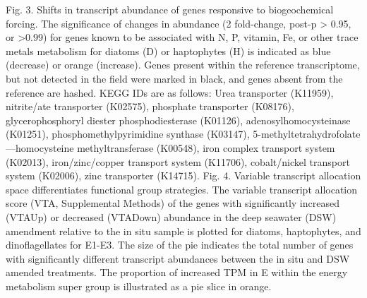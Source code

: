 Fig. 3. Shifts in transcript abundance of genes responsive to biogeochemical forcing. The significance of changes in abundance (2 fold-change, post-p > 0.95, or >0.99) for genes known to be associated with N, P, vitamin, Fe, or other trace metals metabolism for diatoms (D) or haptophytes (H) is indicated as blue (decrease) or orange (increase). Genes present within the reference transcriptome, but not detected in the field were marked in black, and genes absent from the reference are hashed. KEGG IDs are as follows: Urea transporter (K11959), nitrite/ate transporter (K02575), phosphate transporter (K08176), glycerophosphoryl diester phosphodiesterase (K01126), adenosylhomocysteinase (K01251), phosphomethylpyrimidine synthase (K03147), 5-methyltetrahydrofolate—homocysteine methyltransferase (K00548), iron complex transport system (K02013), iron/zinc/copper transport system (K11706), cobalt/nickel transport system (K02006), zinc transporter (K14715). 
Fig. 4. Variable transcript allocation space differentiates functional group strategies. The variable transcript allocation score (VTA, Supplemental Methods) of the genes with significantly increased (VTAUp) or decreased (VTADown) abundance in the deep seawater (DSW) amendment relative to the in situ sample is plotted for diatoms, haptophytes, and dinoflagellates for E1-E3. The size of the pie indicates the total number of genes with significantly different transcript abundances between the in situ and DSW amended treatments. The proportion of increased TPM in E within the energy metabolism super group is illustrated as a pie slice in orange. 

